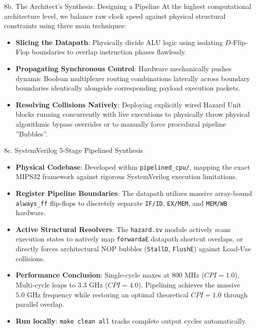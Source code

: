 \documentclass[aspectratio=169]{beamer}
\begin{document}
\begin{frame}{8b. The Architect's Synthesis: Designing a Pipeline}
At the highest computational architecture level, we balance raw clock speed against physical structural constraints using three main techniques:
\begin{itemize}
    \item \textbf{Slicing the Datapath}: Physically divide ALU logic using isolating $D$-Flip-Flop boundaries to overlap instruction phases flawlessly.
    \item \textbf{Propagating Synchronous Control}: Hardware mechanically pushes dynamic Boolean multiplexer routing combinations laterally across boundary boundaries identically alongside corresponding payload execution packets.
    \item \textbf{Resolving Collisions Natively}: Deploying explicitly wired Hazard Unit blocks running concurrently with live executions to physically throw physical algorithmic bypass overrides or to manually force procedural pipeline ''Bubbles''.
\end{itemize}
\end{frame}

\begin{frame}{8c. SystemVerilog 5-Stage Pipelined Synthesis}
\begin{itemize}
    \item \textbf{Physical Codebase}: Developed within \texttt{pipelined\_cpu/}, mapping the exact MIPS32 framework against rigorous SystemVerilog execution limitations.
    \item \textbf{Register Pipeline Boundaries}: The datapath utilizes massive array-bound \texttt{always\_ff} flip-flops to discretely separate \texttt{IF/ID}, \texttt{EX/MEM}, and \texttt{MEM/WB} hardware. 
    \item \textbf{Active Structural Resolvers}: The \texttt{hazard.sv} module actively scans execution states to natively map \texttt{forwardaE} datapath shortcut overlaps, or directly forces architectural NOP bubbles (\texttt{StallD}, \texttt{FlushE}) against Load-Use collisions.
    \item \textbf{Performance Conclusion}: Single-cycle maxes at $800\text{ MHz}$ ($CPI=1.0$), Multi-cycle leaps to $3.3\text{ GHz}$ ($CPI=4.0$). Pipelining achieves the massive $5.0\text{ GHz}$ frequency while restoring an optimal theoretical $CPI=1.0$ through parallel overlap.
    \item \textbf{Run locally}: \texttt{make clean all} tracks complete output cycles automatically.
\end{itemize}
\end{frame}
\end{document}
